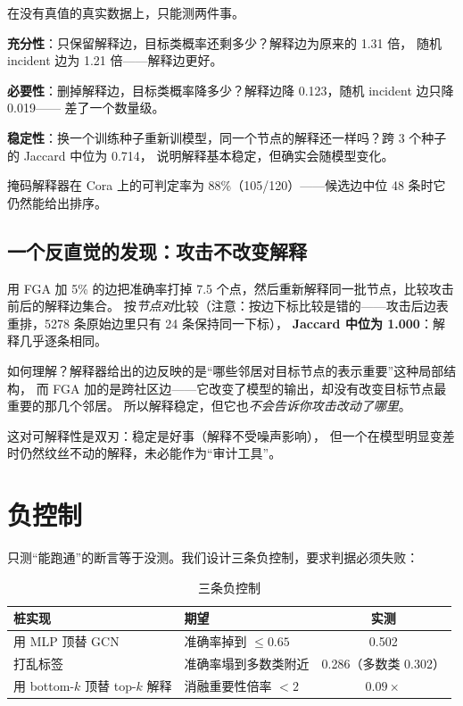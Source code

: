 \documentclass[a4paper,10pt]{article}
\begin{document}
在没有真值的真实数据上，只能测两件事。

\textbf{充分性}：只保留解释边，目标类概率还剩多少？解释边为原来的 1.31 倍，
随机 incident 边为 1.21 倍——解释边更好。

\textbf{必要性}：删掉解释边，目标类概率降多少？解释边降 0.123，随机 incident 边只降 0.019——
差了一个数量级。

\textbf{稳定性}：换一个训练种子重新训模型，同一个节点的解释还一样吗？跨 3 个种子的 Jaccard 中位为 0.714，
说明解释基本稳定，但确实会随模型变化。

掩码解释器在 Cora 上的可判定率为 88\%（105/120）——候选边中位 48 条时它仍然能给出排序。

\subsection{一个反直觉的发现：攻击不改变解释}

用 FGA 加 5\% 的边把准确率打掉 7.5 个点，然后重新解释同一批节点，比较攻击前后的解释边集合。
按\emph{节点对}比较（注意：按边下标比较是错的——攻击后边表重排，5278 条原始边里只有 24 条保持同一下标），
\textbf{Jaccard 中位为 1.000}：解释几乎逐条相同。

如何理解？解释器给出的边反映的是“哪些邻居对目标节点的表示重要”这种局部结构，
而 FGA 加的是跨社区边——它改变了模型的输出，却没有改变目标节点最重要的那几个邻居。
所以解释稳定，但它也\emph{不会告诉你攻击改动了哪里}。

这对可解释性是双刃：稳定是好事（解释不受噪声影响），
但一个在模型明显变差时仍然纹丝不动的解释，未必能作为“审计工具”。

\section{负控制}

只测“能跑通”的断言等于没测。我们设计三条负控制，要求判据必须失败：

\begin{table}[H]
\centering
\caption{三条负控制}
\label{tab:neg}
\begin{tabular}{llc}
\toprule
桩实现 & 期望 & 实测 \\
\midrule
用 MLP 顶替 GCN & 准确率掉到 $\le0.65$ & 0.502 \\
打乱标签 & 准确率塌到多数类附近 & 0.286（多数类 0.302） \\
用 bottom-$k$ 顶替 top-$k$ 解释 & 消融重要性倍率 $<2$ & $0.09\times$ \\
\bottomrule
\end{tabular}
\end{table}
\end{document}

